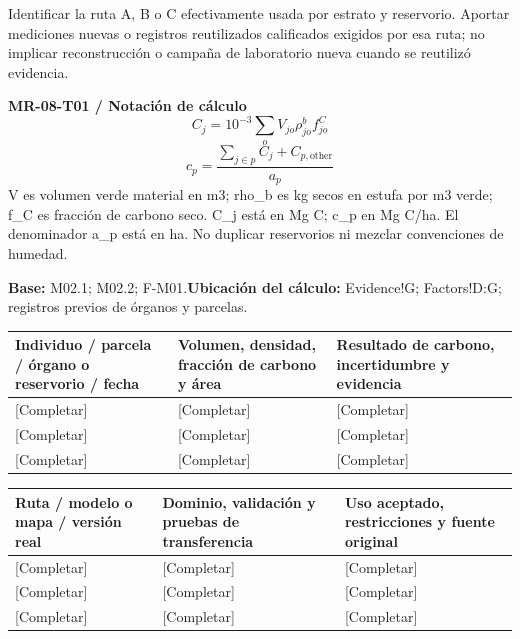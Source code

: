 Identificar la ruta A, B o C efectivamente usada por estrato y reservorio. Aportar mediciones nuevas o registros reutilizados calificados exigidos por esa ruta; no implicar reconstrucción o campaña de laboratorio nueva cuando se reutilizó evidencia.\par
{}
\par\begingroup\sffamily\fontsize{8.4}{10.5}\selectfont\color{NEBGreen}
\textbf{MR-08-T01 / Notación de cálculo}\
{\fontsize{10}{12}\selectfont\[C_j=10^{-3}\sum_o V_{jo}\rho^b_{jo}f^C_{jo}\]}
{\fontsize{10}{12}\selectfont\[c_p=\frac{\sum_{j\in p}C_j+C_{p,\mathrm{other}}}{a_p}\]}
V es volumen verde material en m3; rho\_b es kg secos en estufa por m3 verde; f\_C es fracción de carbono seco. C\_j está en Mg C; c\_p en Mg C/ha. El denominador a\_p está en ha. No duplicar reservorios ni mezclar convenciones de humedad.\par
\textbf{Base:} M02.1; M02.2; F-M01.\quad\textbf{Ubicación del cálculo:} Evidence!G; Factors!D:G; registros previos de órganos y parcelas.\par\endgroup
{\sffamily\fontsize{8.6}{10.7}\selectfont\begin{longtable}{@{}P{48mm}P{61mm}P{53mm}@{}}
\toprule
\textbf{Individuo / parcela / órgano o reservorio / fecha} & \textbf{Volumen, densidad, fracción de carbono y área} & \textbf{Resultado de carbono, incertidumbre y evidencia}\\\midrule\endhead
\rule{0pt}{8mm}[Completar] & [Completar] & [Completar]\\\hline
\rule{0pt}{8mm}[Completar] & [Completar] & [Completar]\\\hline
\rule{0pt}{8mm}[Completar] & [Completar] & [Completar]\\\hline
\end{longtable}}
{\sffamily\fontsize{8.6}{10.7}\selectfont\begin{longtable}{@{}P{48mm}P{61mm}P{53mm}@{}}
\toprule
\textbf{Ruta / modelo o mapa / versión real} & \textbf{Dominio, validación y pruebas de transferencia} & \textbf{Uso aceptado, restricciones y fuente original}\\\midrule\endhead
\rule{0pt}{8mm}[Completar] & [Completar] & [Completar]\\\hline
\rule{0pt}{8mm}[Completar] & [Completar] & [Completar]\\\hline
\rule{0pt}{8mm}[Completar] & [Completar] & [Completar]\\\hline
\end{longtable}}
